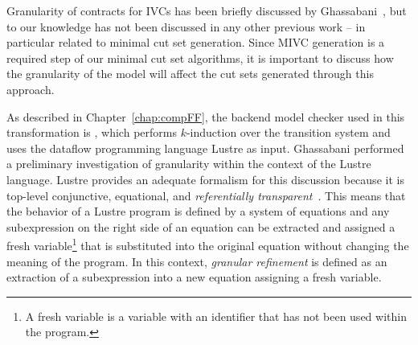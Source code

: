 Granularity of contracts for IVCs has been briefly discussed by Ghassabani~\cite{ghassabani_2018}, but to our knowledge has not been discussed in any other previous work -- in particular related to minimal cut set generation. Since MIVC generation is a required step of our minimal cut set algorithms, it is important to discuss how the granularity of the model will affect the cut sets generated through this approach. 

As described in Chapter~\ref{chap:compFF}, the backend model checker used in this transformation is \jkind, which performs $k$-induction over the transition system and uses the dataflow programming language Lustre as input. Ghassabani performed a preliminary investigation of granularity within the context of the Lustre language. Lustre provides an adequate formalism for this discussion because it is top-level conjunctive, equational, and \textit{referentially transparent}~\cite{Halbwachs91:IEEE}. This means that the behavior of a Lustre program is defined by a system of equations and any subexpression on the right side of an equation can be extracted and assigned a fresh variable\footnote{A fresh variable is a variable with an identifier that has not been used within the program.} that is substituted into the original equation without changing the meaning of the program. In this context, \textit{granular refinement} is defined as an extraction of a subexpression into a new equation assigning a fresh variable. 



